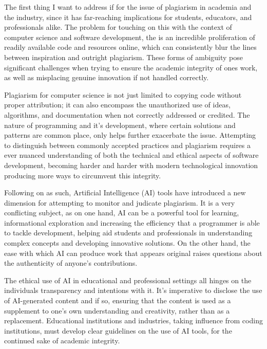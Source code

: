\documentclass{article}
\begin{document}
The first thing I want to address if for the issue of plagiarism in academia and the industry, since it has far-reaching implications for students, educators, and professionals alike. The problem for touching on this with the context of computer science and software development, the is an incredible proliferation of readily available code and resources online, which can consistently blur the lines between inspiration and outright plagiarism. These forms of ambiguity pose significant challenges when trying to ensure the academic integrity of ones work, as well as misplacing genuine innovation if not handled correctly.\\\vspace{0.3cm}

Plagiarism for computer science is not just limited to copying code without proper attribution; it can also encompass the unauthorized use of ideas, algorithms, and documentation when not correctly addressed or credited. The nature of programming and it's development, where certain solutions and patterns are common place, only helps further exacerbate the issue. Attempting to distinguish between commonly accepted practices and plagiarism requires a ever nuanced understanding of both the technical and ethical aspects of software development, becoming harder and harder with modern technological innovation producing more ways to circumvent this integrity.\\\vspace{0.3cm}

Following on as such, Artificial Intelligence (AI) tools have introduced a new dimension for attempting to monitor and judicate plagiarism. It is a very conflicting subject, as on one hand, AI can be a powerful tool for learning, informational exploration and increasing the efficiency that a programmer is able to tackle development, helping aid students and professionals in understanding complex concepts and developing innovative solutions. On the other hand, the ease with which AI can produce work that appears original raises questions about the authenticity of anyone's contributions.\\\vspace{0.3cm}

The ethical use of AI in educational and professional settings all hinges on the individuals transparency and intentions with it. It's imperative to disclose the use of AI-generated content and if so, ensuring that the content is used as a supplement to one's own understanding and creativity, rather than as a replacement. Educational institutions and industries, taking influence from coding institutions, must develop clear guidelines on the use of AI tools, for the continued sake of academic integrity.\\\vspace{0.3cm}
\end{document}
